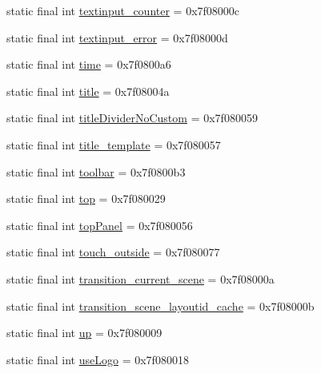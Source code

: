 \begin{CompactItemize}
\item 
static final int \hyperlink{classandroid_1_1support_1_1transition_1_1_r_1_1id_248065f6e9f1b08e94fe6b8eadb35880}{textinput\_\-counter} = 0x7f08000c
\item 
static final int \hyperlink{classandroid_1_1support_1_1transition_1_1_r_1_1id_4fa041718ae5a7565ec0356ca9325b7c}{textinput\_\-error} = 0x7f08000d
\item 
static final int \hyperlink{classandroid_1_1support_1_1transition_1_1_r_1_1id_5e837c55341912ac6da5ed81b1fa382b}{time} = 0x7f0800a6
\item 
static final int \hyperlink{classandroid_1_1support_1_1transition_1_1_r_1_1id_c039495ac9e061da1cede35c2758f125}{title} = 0x7f08004a
\item 
static final int \hyperlink{classandroid_1_1support_1_1transition_1_1_r_1_1id_64efe6c129ea0f16fe41e153508ef84d}{titleDividerNoCustom} = 0x7f080059
\item 
static final int \hyperlink{classandroid_1_1support_1_1transition_1_1_r_1_1id_5e2063f3f797f643a359bddfb2c53be8}{title\_\-template} = 0x7f080057
\item 
static final int \hyperlink{classandroid_1_1support_1_1transition_1_1_r_1_1id_cc01b3c0166dd40669328bfbe6d138d8}{toolbar} = 0x7f0800b3
\item 
static final int \hyperlink{classandroid_1_1support_1_1transition_1_1_r_1_1id_d6aa101ec7906130928d33606d245530}{top} = 0x7f080029
\item 
static final int \hyperlink{classandroid_1_1support_1_1transition_1_1_r_1_1id_b790b5d865860419d63315737bb39c09}{topPanel} = 0x7f080056
\item 
static final int \hyperlink{classandroid_1_1support_1_1transition_1_1_r_1_1id_2e595f204b353162aa9fd4e6ad58cdc2}{touch\_\-outside} = 0x7f080077
\item 
static final int \hyperlink{classandroid_1_1support_1_1transition_1_1_r_1_1id_c520929c6b6ca5b3ca78f8178398d636}{transition\_\-current\_\-scene} = 0x7f08000a
\item 
static final int \hyperlink{classandroid_1_1support_1_1transition_1_1_r_1_1id_700078403656c181ee819ffeda9634bc}{transition\_\-scene\_\-layoutid\_\-cache} = 0x7f08000b
\item 
static final int \hyperlink{classandroid_1_1support_1_1transition_1_1_r_1_1id_af1b4eeda4d5f513e357d3791cf18300}{up} = 0x7f080009
\item 
static final int \hyperlink{classandroid_1_1support_1_1transition_1_1_r_1_1id_8b9dca98a992911a2965950becdac0e3}{useLogo} = 0x7f080018

\end{CompactItemize}
